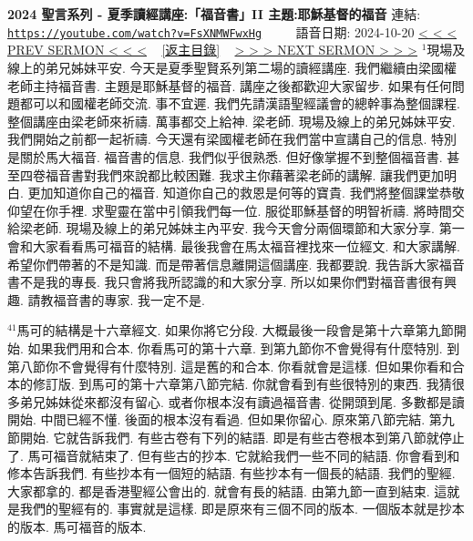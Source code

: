 \documentclass{book}
\begin{document}
\section{}
\label{sec:FsXNMWFwxHg}
\textbf{2024 聖言系列 - 夏季讀經講座:「福音書」II 主題:耶穌基督的福音}
\newline
\newline
連結: \href{https://youtube.com/watch?v=FsXNMWFwxHg}{\texttt{https://youtube.com/watch?v=FsXNMWFwxHg}} ~~~~ 語音日期: 2024-10-20
\newline
\newline
\hyperref[sec:BQvEiworls4]{\small{< < < PREV SERMON < < <}}
~
\hyperref[sec:index]{\small{[返主目錄]}}
~
\hyperref[sec:5AhQhWw7knY]{\small{> > > NEXT SERMON > > >}}
\newline
\newline
$^{1}$現場及線上的弟兄姊妹平安.
今天是夏季聖賢系列第二場的讀經講座.
我們繼續由梁國權老師主持福音書.
主題是耶穌基督的福音.
講座之後都歡迎大家留步.
如果有任何問題都可以和國權老師交流.
事不宜遲.
我們先請漢語聖經議會的總幹事為整個課程.
整個講座由梁老師來祈禱.
萬事都交上給神.
梁老師.
現場及線上的弟兄姊妹平安.
我們開始之前都一起祈禱.
今天還有梁國權老師在我們當中宣講自己的信息.
特別是關於馬大福音.
福音書的信息.
我們似乎很熟悉.
但好像掌握不到整個福音書.
甚至四卷福音書對我們來說都比較困難.
我求主你藉著梁老師的講解.
讓我們更加明白.
更加知道你自己的福音.
知道你自己的救恩是何等的寶貴.
我們將整個課堂恭敬仰望在你手裡.
求聖靈在當中引領我們每一位.
服從耶穌基督的明智祈禱.
將時間交給梁老師.
現場及線上的弟兄姊妹主內平安.
我今天會分兩個環節和大家分享.
第一會和大家看看馬可福音的結構.
最後我會在馬太福音裡找來一位經文.
和大家講解.
希望你們帶著的不是知識.
而是帶著信息離開這個講座.
我都要說.
我告訴大家福音書不是我的專長.
我只會將我所認識的和大家分享.
所以如果你們對福音書很有興趣.
請教福音書的專家.
我一定不是.

$^{41}$馬可的結構是十六章經文.
如果你將它分段.
大概最後一段會是第十六章第九節開始.
如果我們用和合本.
你看馬可的第十六章.
到第九節你不會覺得有什麼特別.
到第八節你不會覺得有什麼特別.
這是舊的和合本.
你看就會是這樣.
但如果你看和合本的修訂版.
到馬可的第十六章第八節完結.
你就會看到有些很特別的東西.
我猜很多弟兄姊妹從來都沒有留心.
或者你根本沒有讀過福音書.
從開頭到尾.
多數都是讀開始.
中間已經不懂.
後面的根本沒有看過.
但如果你留心.
原來第八節完結.
第九節開始.
它就告訴我們.
有些古卷有下列的結語.
即是有些古卷根本到第八節就停止了.
馬可福音就結束了.
但有些古的抄本.
它就給我們一些不同的結語.
你會看到和修本告訴我們.
有些抄本有一個短的結語.
有些抄本有一個長的結語.
我們的聖經.
大家都拿的.
都是香港聖經公會出的.
就會有長的結語.
由第九節一直到結束.
這就是我們的聖經有的.
事實就是這樣.
即是原來有三個不同的版本.
一個版本就是抄本的版本.
馬可福音的版本.
\end{document}

